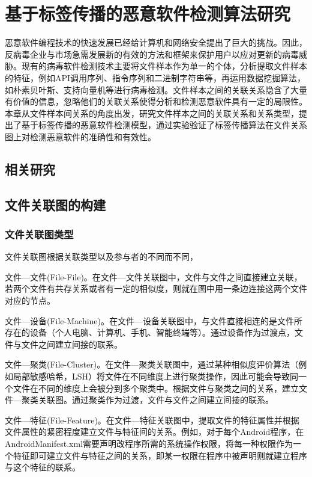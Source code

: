 \chapter{基于标签传播的恶意软件检测算法研究}
恶意软件编程技术的快速发展已经给计算机和网络安全提出了巨大的挑战。因此，反病毒企业与市场急需发展新的有效的方法和框架来保护用户以应对更新的病毒威胁。现有的病毒软件检测技术主要将文件样本作为单一的个体，分析提取文件样本的特征，例如API调用序列、指令序列和二进制字符串等，再运用数据挖掘算法，如朴素贝叶斯、支持向量机等进行病毒检测。文件样本之间的关联关系隐含了大量有价值的信息，忽略他们的关联关系使得分析和检测恶意软件具有一定的局限性。本章从文件样本间关系的角度出发，研究文件样本之间的关联关系和关系类型，提出了基于标签传播的恶意软件检测模型，通过实验验证了标签传播算法在文件关系图上对检测恶意软件的准确性和有效性。
\section{相关研究}


\section{文件关联图的构建}
\subsection{文件关联图类型}
文件关联图根据关联类型以及参与者的不同而不同，
\begin{asparaenum}
\item 文件—文件(File-File)。在文件—文件关联图中，文件与文件之间直接建立关联，若两个文件有共存关系或者有一定的相似度，则就在图中用一条边连接这两个文件对应的节点。
\item 文件—设备(File-Machine)。在文件—设备关联图中，与文件直接相连的是文件所存在的设备（个人电脑、计算机、手机、智能终端等）。通过设备作为过渡点，文件与文件之间建立间接的联系。
\item 文件—聚类(File-Cluster)。在文件—聚类关联图中，通过某种相似度评价算法（例如局部敏感哈希，LSH）将文件在不同维度上进行聚类操作，因此可能会导致同一个文件在不同的维度上会被分到多个聚类中。根据文件与聚类之间的关系，建立文件—聚类关联图。通过聚类作为过渡，文件与文件之间建立间接的联系。
\item 文件—特征(File-Feature)。在文件—特征关联图中，提取文件的特征属性并根据文件属性的紧密程度建立文件与特征间的关系。例如，对于每个Android程序，在AndroidManifest.xml需要声明改程序所需的系统操作权限，将每一种权限作为一个特征即可建立文件与特征之间的关系，即某一权限在程序中被声明则就建立程序与这个特征的联系。
\end{asparaenum}

